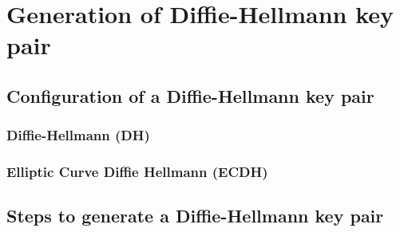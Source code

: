 \chapter{Generation of Diffie-Hellmann key pair}

\section{Configuration of a Diffie-Hellmann key pair}
\subsection{Diffie-Hellmann (DH)}
\subsection{Elliptic Curve Diffie Hellmann (ECDH)}


\section{Steps to generate a Diffie-Hellmann key pair}